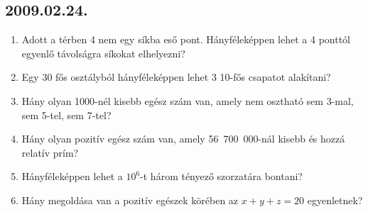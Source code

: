\subsection*{2009.02.24.}
\begin{enumerate}
\item Adott a térben 4 nem egy síkba eső pont. Hányféleképpen lehet a 4 ponttól egyenlő távolságra síkokat elhelyezni?
\item Egy 30 fős osztályból hányféleképpen lehet 3 10-fős csapatot alakítani?
\item Hány olyan 1000-nél kisebb egész szám van, amely nem osztható sem 3-mal, sem 5-tel, sem 7-tel?
\item Hány olyan pozitív egész szám van, amely 56~700~000-nál kisebb és hozzá relatív prím?
\item Hányféleképpen lehet a $10^6$-t három tényező szorzatára bontani?
\item Hány megoldása van a pozitív egészek körében az $x+y+z=20$ egyenletnek?
\end{enumerate}

